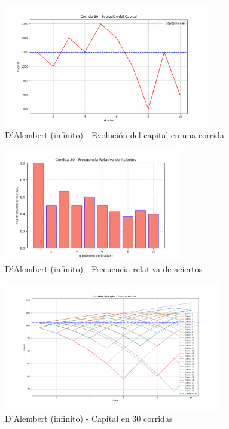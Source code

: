 \documentclass{article}
\begin{document}
\begin{figure}[H]
    \centering
    \includegraphics[width=0.8\textwidth]{./images/capital_corrida_30_d_i.png}
    \caption{D’Alembert (infinito) - Evolución del capital en una corrida}
\end{figure}

\begin{figure}[H]
    \centering
    \includegraphics[width=0.7\textwidth]{./images/frsa_corrida_30_d_i.png}
    \caption{D’Alembert (infinito) - Frecuencia relativa de aciertos}
\end{figure}

\begin{figure}[H]
    \centering
    \includegraphics[width=0.85\textwidth]{./images/capital_todas_corridas_d_i.png}
    \caption{D’Alembert (infinito) - Capital en 30 corridas}
\end{figure}
\end{document}
